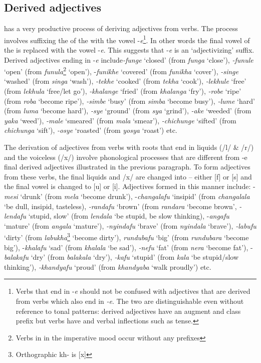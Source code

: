 \documentclass[output=paper,
modfonts
]{langscibook}
\begin{document}
\subsection{Derived adjectives}
 has a very productive process of deriving adjectives from verbs. The process involves suffixing the  of the  with the vowel -\textit{e}\footnote{Verbs that end in -\textit{e }should not be confused with adjectives that are derived from verbs which also end in \textit{-e}. The two are distinguishable even without reference to tonal patterns: derived adjectives have an augment and class prefix but verbs have  and verbal inflections such as tense.}. In other words the final vowel of the   is replaced with the vowel -\textit{e}. This suggests that -\textit{e} is an ‘adjectivizing’ suffix. Derived adjectives ending in -\textit{e} include\textit{-funge} ‘closed’ (from \textit{funga} ‘close’), \textit{-funule} ‘open’ (from \textit{funula}\footnote{Verbs in  in the imperative mood occur without any prefixes } ‘open’), -\textit{funikhe} ‘covered’ (from \textit{funikha} ‘cover’), \textit{-singe} ‘washed’ (from \textit{singa} ‘wash’), \textit{-tekhe} ‘cooked’ (from \textit{tekha} ‘cook’), \textit{-lekhule} ‘free’ (from \textit{lekhula} ‘free/let go’), \textit{-khalange} ‘fried’ (from \textit{khalanga }‘fry’), \textit{-robe} ‘ripe’ (from \textit{roba} ‘become ripe’), \textit{-simbe} ‘busy’ (from \textit{simba} ‘become busy’), \textit{-lume} ‘hard’ (from \textit{luma} ‘become hard’), \textit{-sye} ‘ground’ (from \textit{sya} ‘grind’), \textit{-ake} ‘weeded’ (from \textit{yaka }‘weed’), \textit{-male} ‘smeared’ (from \textit{mala} ‘smear’), \textit{-chichunge} ‘sifted’ (from \textit{chichunga} ‘sift’), \textit{-osye} ‘roasted’ (from \textit{yosya} ‘roast’) etc.

The derivation of adjectives from verbs with roots that end in liquids (/l/ \& /r/) and the voiceless  (/x/) involve phonological processes that are different from -e final derived adjectives illustrated in the previous paragraph. To form adjectives from these verbs, the  final liquids and /x/ are changed into  – either [f] or [s] and the final vowel is changed to [u] or [i]. Adjectives formed in this manner include: -\textit{mesi} ‘drunk’ (from \textit{mela} ‘become drunk’), -\textit{changalafu} ‘insipid’ (from \textit{changalala} ‘be dull, insipid, tasteless), \textit{-randafu} ‘brown’ (from \textit{randara} ‘become brown’, \textit{-lendafu} ‘stupid, slow’ (from \textit{lendala} ‘be stupid, be slow thinking), -\textit{angafu} ‘mature’ (from \textit{angala} ‘mature’), \textit{-nyindafu} ‘brave’ (from \textit{nyindala} ‘brave’), \textit{-labufu} ‘dirty’ (from \textit{labukha}\footnote{Orthographic kh- is [x]} ‘become dirty’), \textit{rundubafu} ‘big’ (from \textit{rundubara} ‘become big’), -\textit{khalafu} ‘sad’ (from \textit{khalala} ‘be sad’), \textit{-nefu} ‘fat’ (from \textit{nera} ‘become fat’), -\textit{balakafu} ‘dry’ (from \textit{balakala} ‘dry’), \textit{-kafu} ‘stupid’ (from \textit{kala} ‘be stupid/slow thinking’), \textit{-khandyafu} ‘proud’ (from \textit{khandyaba }‘walk proudly’) etc.
\end{document}
